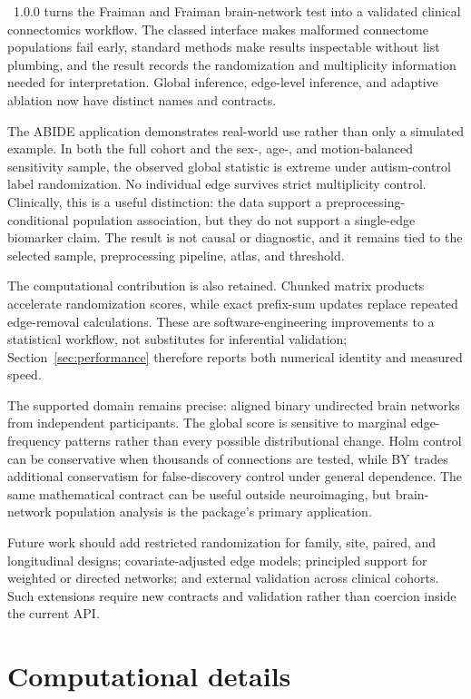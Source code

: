 \documentclass[article]{jss}\usepackage[]{graphicx}\usepackage[]{xcolor}
\begin{document}
~1.0.0 turns the Fraiman and Fraiman brain-network test into
a validated clinical connectomics workflow. The classed interface makes
malformed connectome populations fail early, standard methods make results
inspectable without list plumbing, and the result records the randomization
and multiplicity information needed for interpretation. Global inference,
edge-level inference, and adaptive ablation now have distinct names and
contracts.

The ABIDE application demonstrates real-world use rather than only a simulated
example. In both the full cohort and the sex-, age-, and motion-balanced
sensitivity sample, the observed global statistic is extreme under
autism-control label randomization. No individual edge survives strict
multiplicity control. Clinically, this is a useful distinction: the data
support a preprocessing-conditional population association, but they do not
support a single-edge biomarker claim. The result is not causal or diagnostic,
and it remains tied to the selected sample, preprocessing pipeline, atlas, and
threshold.

The computational contribution is also retained. Chunked matrix products
accelerate randomization scores, while exact prefix-sum updates replace
repeated edge-removal calculations. These are software-engineering
improvements to a statistical workflow, not substitutes for inferential
validation; Section~\ref{sec:performance} therefore reports both numerical
identity and measured speed.

The supported domain remains precise: aligned binary undirected brain networks
from independent participants. The global score is sensitive to marginal
edge-frequency patterns rather than every possible distributional change.
Holm control can be conservative when thousands of connections are tested,
while BY trades additional conservatism for false-discovery control under
general dependence. The same mathematical contract can be useful outside
neuroimaging, but brain-network population analysis is the package's primary
application.

Future work should add restricted randomization for family, site, paired, and
longitudinal designs; covariate-adjusted edge models; principled support for
weighted or directed networks; and external validation across clinical
cohorts. Such extensions require new contracts and validation rather than
coercion inside the current API.

\section*{Computational details}
\end{document}
